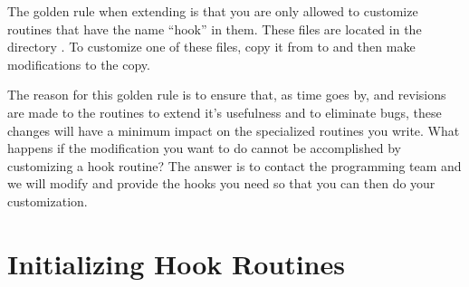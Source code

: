 The golden rule when extending \tao is that you are only allowed to customize routines that have the
name ``hook'' in them. These files are located in the directory .  To customize one of
these files, copy it from  to  and then make modifications to the copy.

The reason for this golden rule is to ensure that, as time goes by, and revisions are made to the
\tao routines to extend it's usefulness and to eliminate bugs, these changes will have a minimum
impact on the specialized routines you write.  What happens if the modification you want to do
cannot be accomplished by customizing a hook routine? The answer is to contact the \tao programming
team and we will modify \tao and provide the hooks you need so that you can then do your
customization.

\section{Initializing Hook Routines}

